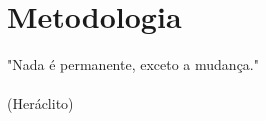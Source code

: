 \chapter{Metodologia}
\label{chap:meto}
\begin{flushright}
	"Nada é permanente, exceto a mudança." \\
	\ \\
	(Heráclito)
\end{flushright}


